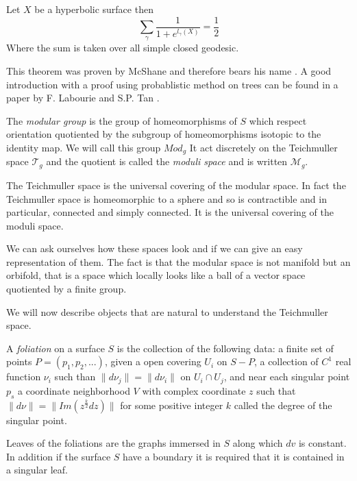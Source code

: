 \begin{thm}
Let $X$ be a hyperbolic surface then \[
\sum_{\gamma} \frac{1}{1+e^{l_{\gamma}(X)}}=\frac{1}{2}
\]
Where the sum is taken over all simple closed geodesic.
\end{thm}

This theorem was proven by McShane and therefore bears his name \cite{Mcshane95simplegeodesics}. A good introduction with a proof using probablistic method on trees can be found in a paper by F. Labourie and S.P. Tan \cite{labourie:hal-01654564}.

\begin{dfnt}
The \emph{modular group} is the group of homeomorphisms of $S$ which respect orientation quotiented by the subgroup of homeomorphisms isotopic to the identity map. We will call this group $Mod_g$
It act discretely on the Teichmuller space $\mathcal{T}_g$ and the quotient is called the \emph{moduli space} and is written $\mathcal{M}_g$.
\end{dfnt}

The Teichmuller space is the universal covering of the modular space. In fact the Teichmuller space is homeomorphic to a sphere and so is contractible and in particular, connected and simply connected. It is the universal covering of the moduli space.

We can ask ourselves how these spaces look and if we can give an easy representation of them. The fact is that the modular space is not manifold but an orbifold, that is a space which locally looks like a ball of a vector space quotiented by a finite group.

We will now describe objects that are natural to understand the Teichmuller space.

\begin{dfnt}
A \emph{foliation} on a surface $S$ is the collection of the following data: a finite set of points $P=(p_1,p_2,...)$, given a open covering $U_i$ on $S-P$, a collection of $C^1$
 real function $\nu_i$ such than $\| d \nu_j \| = \| d \nu_i \|$  on $U_i \cap U_j$,
 and near each singular point $p_s$ a coordinate neighborhood $V$ with complex coordinate $z$ such that $\| d \nu \| = \| Im(z^{\frac{k}{2}}dz) \|$ for some positive integer $k$ called the degree of the singular point.

 Leaves of the foliations are the graphs immersed in $S$ along which $dv$ is constant. In addition if the surface $S$  have a boundary it is required that it is contained in a singular leaf.
\end{dfnt}

